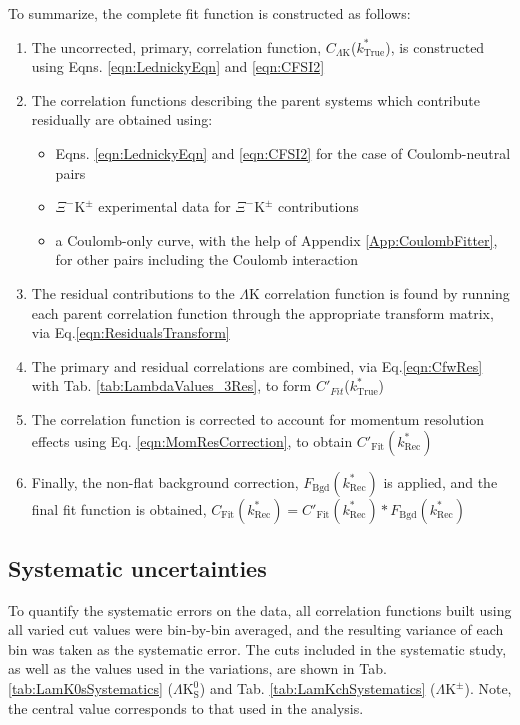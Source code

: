 \documentclass[ALICE,manyauthors]{cernphprep}
\newcommand{\ktrue}{$k^{*}_{\mathrm{True}}$\xspace}
\newcommand{\LamK}{$\Lambda$K\xspace}
\newcommand{\LamKpm}{$\Lambda\mathrm{K^{\pm}}$\xspace}
\newcommand{\LamKs}{$\Lambda\mathrm{K^{0}_{S}}$\xspace}
\newcommand{\XiKpm}{$\Xi^{-}\mathrm{K^{\pm}}$\xspace}
\begin{document}
To summarize, the complete fit function is constructed as follows:
\begin{enumerate}
 \item The uncorrected, primary, correlation function, $C_{\Lambda\mathrm{K}}$(\ktrue), is constructed using Eqns. \ref{eqn:LednickyEqn} and \ref{eqn:CFSI2}
 \item The correlation functions describing the parent systems which contribute residually are obtained using:
 \begin{itemize}
  \item Eqns. \ref{eqn:LednickyEqn} and \ref{eqn:CFSI2} for the case of Coulomb-neutral pairs
  \item \XiKpm experimental data for \XiKpm contributions
  \item a Coulomb-only curve, with the help of Appendix \ref{App:CoulombFitter}, for other pairs including the Coulomb interaction 
 \end{itemize} 
 \item The residual contributions to the \LamK correlation function is found by running each parent correlation function through the appropriate transform matrix, via Eq.\ref{eqn:ResidualsTransform}
 \item The primary and residual correlations are combined, via Eq.\ref{eqn:CfwRes} with Tab. \ref{tab:LambdaValues_3Res}, to form $C'_{Fit}$(\ktrue)
 \item The correlation function is corrected to account for momentum resolution effects using Eq. \ref{eqn:MomResCorrection}, to obtain $C'_{\mathrm{Fit}}(k^{*}_{\mathrm{Rec}})$
 \item Finally, the non-flat background correction, $F_{\mathrm{Bgd}}(k^{*}_{\mathrm{Rec}})$ is applied, and the final fit function is obtained, $C_{\mathrm{Fit}}(k^{*}_{\mathrm{Rec}}) = C'_{\mathrm{Fit}}(k^{*}_{\mathrm{Rec}})*F_{\mathrm{Bgd}}(k^{*}_{\mathrm{Rec}})$
\end{enumerate}

\subsection{Systematic uncertainties}
\label{SysErrs}

To quantify the systematic errors on the data, all correlation functions built using all varied cut values were bin-by-bin averaged, and the resulting variance of each bin was taken as the systematic error.  
The cuts included in the systematic study, as well as the values used in the variations, are shown in Tab. \ref{tab:LamK0sSystematics} (\LamKs) and Tab. \ref{tab:LamKchSystematics} (\LamKpm).  
Note, the central value corresponds to that used in the analysis.
\end{document}
